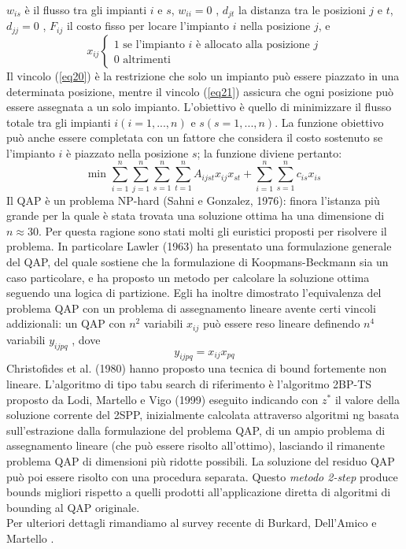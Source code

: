\documentclass[12pt,a4paper,openright,twoside]{report}
\begin{document}
$w_{is}$ \`{e} il flusso tra gli impianti $i$ e $s$, $w_{ii} = 0$ , $d_{jt}$ la distanza tra le posizioni $j$ e $t$, $d_{jj} = 0$ , $F_{ij}$ il costo fisso per locare l'impianto $i$ nella posizione $j$, e
\begin{equation} \label{eq24}
x_{ij}
\left\{
\begin{array}{ll}
1 \mbox{ se l'impianto $i$ \`{e} allocato alla posizione $j$}\\
0 \mbox{ altrimenti}
\end{array}
\right.
\end{equation}
Il vincolo (\ref{eq20}) \`{e} la restrizione che solo un impianto pu\`{o} essere piazzato in una determinata posizione, mentre il vincolo (\ref{eq21}) assicura che ogni posizione pu\`{o} essere assegnata a un solo impianto. L'obiettivo \`{e} quello di minimizzare il flusso totale tra gli impianti $i (i=1, ..., n)$ e $s (s=1, ..., n)$.
La funzione obiettivo pu\`{o} anche essere completata con un fattore che considera il costo sostenuto se l'impianto $i$ \`{e} piazzato nella posizione $s$; la funzione diviene pertanto:
\begin{equation} \label{eq25}
\mbox{min } \sum_{i=1}^{n}\sum_{j=1}^{n}\sum_{s=1}^{n}\sum_{t=1}^{n} A_{ijst}x_{ij}x_{st} +  \sum_{i=1}^{n}\sum_{s=1}^{n} c_{is} x_{is}
\end{equation}
Il QAP \`{e} un problema NP-hard (Sahni e Gonzalez, 1976): finora l'istanza pi\`{u} grande per la quale \`{e} stata trovata una soluzione ottima ha una dimensione di $n \approx 30$. Per questa ragione sono stati molti gli euristici proposti per risolvere il problema. In particolare Lawler (1963) ha presentato una formulazione generale del QAP, del quale sostiene che la formulazione di Koopmans-Beckmann sia un caso particolare, e ha proposto un metodo per calcolare la soluzione ottima seguendo una logica di partizione. Egli ha inoltre dimostrato l'equivalenza del problema QAP con un problema di assegnamento lineare avente certi vincoli addizionali: un QAP con $n^{2}$ variabili $x_{ij}$ pu\`{o} essere reso lineare definendo $n^{4}$ variabili $y_{ijpq}$ , dove
\begin{equation} \label{eq26}
y_{ijpq} = x_{ij}x_{pq}
\end{equation}
Christofides et al. (1980) hanno proposto una tecnica di bound fortemente non lineare. L'algoritmo di tipo tabu search di riferimento \`{e} l'algoritmo 2BP-TS proposto da Lodi, Martello e Vigo (1999) eseguito indicando con $z^{*}$ il valore della soluzione corrente del 2SPP, inizialmente calcolata attraverso algoritmi ng basata sull'estrazione dalla formulazione del problema QAP, di un ampio problema di assegnamento lineare (che pu\`{o} essere risolto all'ottimo), lasciando il rimanente problema QAP di dimensioni pi\`{u} ridotte possibili. La soluzione del residuo QAP pu\`{o} poi essere risolto con una procedura separata. Questo \textit{metodo 2-step} produce bounds migliori rispetto a quelli prodotti all'applicazione diretta di algoritmi di bounding al QAP originale.
\\Per ulteriori dettagli rimandiamo al survey recente di Burkard, Dell'Amico e Martello \cite{buckard}.
\end{document}
